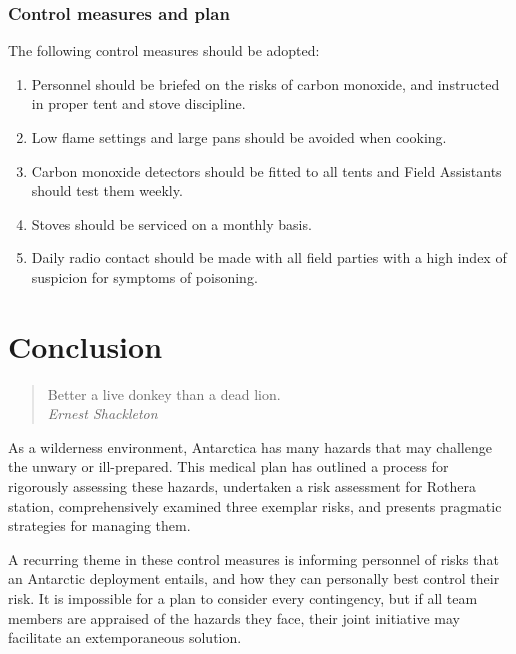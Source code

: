 \documentclass[12pt,a4paper]{article}
\begin{document}
\subsubsection{Control measures and plan}

The following control measures should be adopted:

\begin{enumerate}
    \item Personnel should be briefed on the risks of carbon monoxide, and instructed in proper tent and stove discipline.
    \item Low flame settings and large pans should be avoided when cooking.
    \item Carbon monoxide detectors should be fitted to all tents and Field Assistants should test them weekly.
    \item Stoves should be serviced on a monthly basis.
    \item Daily radio contact should be made with all field parties with a high index of suspicion for symptoms of poisoning.
\end{enumerate}

\pagebreak

\section{Conclusion}

\begin{quote}
Better a live donkey than a dead lion. \\
\em Ernest Shackleton
\end{quote}

As a wilderness environment, Antarctica has many hazards that may challenge the unwary or ill-prepared. This medical plan has outlined a process for rigorously assessing these hazards, undertaken a risk assessment for Rothera station, comprehensively examined three exemplar risks, and presents pragmatic strategies for managing them.

A recurring theme in these control measures is informing personnel of risks that an Antarctic deployment entails, and how they can personally best control their risk. It is impossible for a plan to consider every contingency, but if all team members are appraised of the hazards they face, their joint initiative may facilitate an extemporaneous solution.





\end{document}
